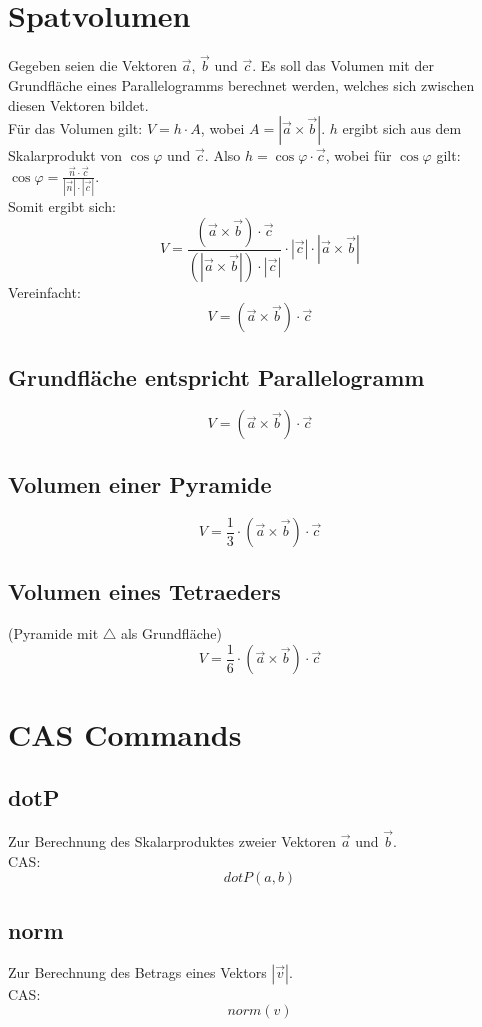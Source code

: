 \documentclass[a4paper,12pt]{article}
\begin{document}
\section{Spatvolumen}
Gegeben seien die Vektoren $\vec{a}$, $\vec{b}$ und $\vec{c}$. Es soll das Volumen mit der Grundfläche eines Parallelogramms berechnet werden, welches sich zwischen diesen Vektoren bildet.\\
Für das Volumen gilt: $V = h \cdot A$, wobei $A = |\vec{a} \times \vec{b}|$. $h$ ergibt sich aus dem Skalarprodukt von $\cos{\varphi}$ und $\vec{c}$. Also $h = \cos{\varphi} \cdot \vec{c}$, wobei 
für $\cos{\varphi}$ gilt: $\cos{\varphi} = \frac{\vec{n} \cdot \vec{c}}{|\vec{n}| \cdot |\vec{c}|}$.\\
Somit ergibt sich:
$$V = \frac{(\vec{a} \times \vec{b}) \cdot \vec{c}}{(|\vec{a} \times \vec{b}|) \cdot |\vec{c}|} \cdot |\vec{c}| \cdot |\vec{a} \times \vec{b}|$$
Vereinfacht:
$$V = (\vec{a} \times \vec{b}) \cdot \vec{c}$$
\subsection{Grundfläche entspricht Parallelogramm}
$$V = (\vec{a} \times \vec{b}) \cdot \vec{c}$$
\subsection{Volumen einer Pyramide}
$$V = \frac{1}{3} \cdot (\vec{a} \times \vec{b}) \cdot \vec{c}$$
\subsection{Volumen eines Tetraeders}
(Pyramide mit $\triangle$ als Grundfläche)
$$V = \frac{1}{6} \cdot (\vec{a} \times \vec{b}) \cdot \vec{c}$$
\pagebreak
\section{CAS Commands}
\subsection{dotP}
Zur Berechnung des Skalarproduktes zweier Vektoren $\vec{a}$ und $\vec{b}$.\\
CAS:\\
$$dotP(a,b)$$
\subsection{norm}
Zur Berechnung des Betrags eines Vektors $|\vec{v}|$.\\
CAS:\\
$$norm(v)$$
\end{document}
